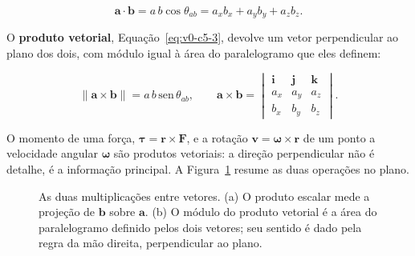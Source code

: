 \documentclass[12pt,a4paper]{article}
\numberwithin{equation}{section}
\numberwithin{table}{section}
\numberwithin{figure}{section}
\begin{document}
\begin{equation}\label{eq:v0-c5-2}
\bm{a}\cdot\bm{b} = a\,b\cos\theta_{ab}
                  = a_x b_x + a_y b_y + a_z b_z.
\end{equation}

O \textbf{produto vetorial}, Equação~\eqref{eq:v0-c5-3}, devolve um vetor
perpendicular ao plano dos dois, com módulo igual à área do paralelogramo
que eles definem:

\begin{equation}\label{eq:v0-c5-3}
\lVert\bm{a}\times\bm{b}\rVert = a\,b\,\mathrm{sen}\,\theta_{ab},
\qquad
\bm{a}\times\bm{b} =
\begin{vmatrix}
\bm{i} & \bm{j} & \bm{k} \\
a_x & a_y & a_z \\
b_x & b_y & b_z
\end{vmatrix}.
\end{equation}

O momento de uma força, $\bm{\tau} = \bm{r}\times\bm{F}$, e a rotação
$\bm{v} = \bm{\omega}\times\bm{r}$ de um ponto a velocidade angular
$\bm{\omega}$ são produtos vetoriais: a direção perpendicular não é
detalhe, é a informação principal. A Figura~\ref{fig:v0-c5-1} resume as
duas operações no plano.

\begin{figure}[H]
\centering
{}
\caption[Produto escalar como projeção e produto vetorial como área.]{%
As duas multiplicações entre vetores. (a) O produto escalar mede a
projeção de $\bm{b}$ sobre $\bm{a}$. (b) O módulo do produto vetorial é a
área do paralelogramo definido pelos dois vetores; seu sentido é dado pela
regra da mão direita, perpendicular ao plano.}
\label{fig:v0-c5-1}
\end{figure}
\end{document}
